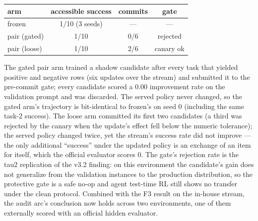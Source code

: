 \begin{center}
\small
\begin{tabular}{lccc}
\toprule
arm & accessible success & commits & gate \\
\midrule
frozen       & 1/10 (3 seeds) & --- & --- \\
pair (gated) & 1/10 & 0/6 & rejected \\
pair (loose) & 1/10 & 2/6 & canary ok \\
\bottomrule
\end{tabular}
\end{center}

The gated pair arm trained a shadow candidate after every task that
yielded positive and negative rows (six updates over the stream) and
submitted it to the pre-commit gate; every candidate scored a $0.00$
improvement rate on the validation prompt and was discarded. The served
policy never changed, so the gated arm's trajectory is bit-identical to
frozen's on seed 0 (including the same task-2 success). The loose arm
committed its first two candidates (a third was rejected by the canary
when the update's effect fell below the numeric tolerance); the served
policy changed twice, yet the stream's success rate did not improve ---
the only additional ``success'' under the updated policy is an exchange
of an item for itself, which the official evaluator scores $0$. The
gate's rejection rate is the tau2 replication of the v3.2 finding: on
this environment the candidate's gain does not generalize from the
validation instances to the production distribution, so the protective
gate is a safe no-op and agent test-time RL still shows no transfer
under the clean protocol. Combined with the F3 result on the in-house
stream, the audit arc's conclusion now holds across two environments,
one of them externally scored with an official hidden evaluator.
